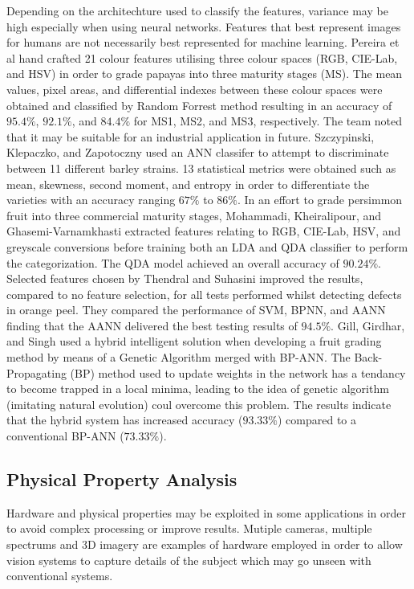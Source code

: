 \documentclass[fleqn,twoside]{article}
\begin{document}
Depending on the architechture used to classify the features, variance may be high especially when using neural networks. Features that best represent images for humans are not necessarily best represented for machine learning. Pereira et al \cite{pereira} hand crafted 21 colour features utilising three colour spaces (RGB, CIE-Lab, and HSV) in order to grade papayas into three maturity stages (MS). The mean values, pixel areas, and differential indexes between these colour spaces were obtained and classified by Random Forrest method resulting in an accuracy of $95.4\%$, $92.1\%$, and $84.4\%$ for MS1, MS2, and MS3, respectively. The team noted that it may be suitable for an industrial application in future. Szczypinski, Klepaczko, and Zapotoczny \cite{szczypinski} used an ANN classifer to attempt to discriminate between 11 different barley strains. 13 statistical metrics were obtained such as mean, skewness, second moment, and entropy in order to differentiate the varieties with an accuracy ranging $67\%$ to $86\%$. In an effort to grade persimmon fruit into three commercial maturity stages, Mohammadi, Kheiralipour, and Ghasemi-Varnamkhasti \cite{mohammadi} extracted features relating to RGB, CIE-Lab, HSV, and greyscale conversions before training both an LDA and QDA classifier to perform the categorization. The QDA model achieved an overall accuracy of $90.24\%$. Selected features chosen by Thendral and Suhasini \cite{thendral} improved the results, compared to no feature selection, for all tests performed whilst detecting defects in orange peel. They compared the performance of SVM, BPNN, and AANN finding that the AANN delivered the best testing results of $94.5\%$. Gill, Girdhar, and Singh \cite{gill} used a hybrid intelligent solution when developing a fruit grading method by means of a Genetic Algorithm merged with BP-ANN. The Back-Propagating (BP) method used to update weights in the network has a tendancy to become trapped in a local minima, leading to the idea of genetic algorithm (imitating natural evolution) coul overcome this problem. The results indicate that the hybrid system has increased accuracy ($93.33\%$) compared to a conventional BP-ANN ($73.33\%$).  



\subsection{Physical Property Analysis}

Hardware and physical properties may be exploited in some applications in order to avoid complex processing or improve results. Mutiple cameras, multiple spectrums and 3D imagery are examples of hardware employed in order to allow vision systems to capture details of the subject which may go unseen with conventional systems. 
\end{document}
